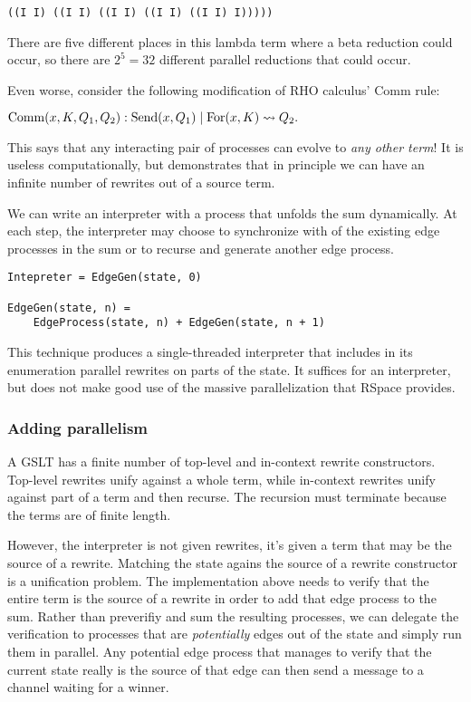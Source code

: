 \documentclass{article}
\begin{document}
\begin{verbatim}
((I I) ((I I) ((I I) ((I I) ((I I) I)))))
\end{verbatim}

There are five different places in this lambda term where a beta reduction could occur, so there are $2^5 = 32$ different parallel reductions that could occur.

Even worse, consider the following modification of RHO calculus' Comm rule: \bigskip

\noindent ${\rm Comm}(x, K, Q_1, Q_2): {\rm Send}(x, Q_1) \;|\; {\rm For}(x, K) \leadsto Q_2.$ \bigskip

\noindent This says that any interacting pair of processes can evolve to {\em any other term}!  It is useless computationally, but demonstrates that in principle we can have an infinite number of rewrites out of a source term.

We can write an interpreter with a process that unfolds the sum dynamically.  At each step, the interpreter may choose to synchronize with of the existing edge processes in the sum or to recurse and generate another edge process.

\begin{verbatim}
Intepreter = EdgeGen(state, 0)

EdgeGen(state, n) =
    EdgeProcess(state, n) + EdgeGen(state, n + 1)
\end{verbatim}

This technique produces a single-threaded interpreter that includes in its enumeration parallel rewrites on parts of the state.  It suffices for an interpreter, but does not make good use of the massive parallelization that RSpace provides.

\subsubsection{Adding parallelism}

A GSLT has a finite number of top-level and in-context rewrite constructors.  Top-level rewrites unify against a whole term, while in-context rewrites unify against part of a term and then recurse.  The recursion must terminate because the terms are of finite length.

However, the interpreter is not given rewrites, it's given a term that may be the source of a rewrite.  Matching the state agains the source of a rewrite constructor is a unification problem.  The implementation above needs to verify that the entire term is the source of a rewrite in order to add that edge process to the sum.  Rather than preverifiy and sum the resulting processes, we can delegate the verification to processes that are {\em potentially} edges out of the state and simply run them in parallel.  Any potential edge process that manages to verify that the current state really is the source of that edge can then send a message to a channel waiting for a winner.
\end{document}
